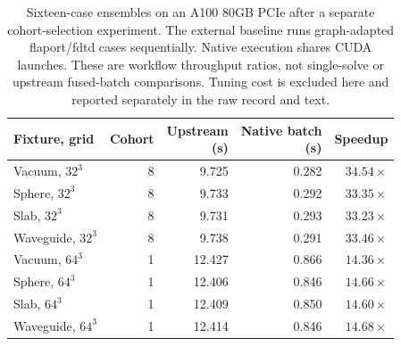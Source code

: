 \begin{table}[tbp]
\centering
\small
\renewcommand{\arraystretch}{1.15}
\caption{Sixteen-case ensembles on an A100 80GB PCIe after a separate cohort-selection experiment. The external baseline runs graph-adapted flaport/fdtd cases sequentially. Native execution shares CUDA launches. These are workflow throughput ratios, not single-solve or upstream fused-batch comparisons. Tuning cost is excluded here and reported separately in the raw record and text.}
\label{tab:ensembles}
\begin{tabular}{@{}lrrrr@{}}
\toprule
Fixture, grid & Cohort & \shortstack{Upstream\\(s)} & \shortstack{Native batch\\(s)} & Speedup \\
\midrule
Vacuum, $32^3$ & 8 & 9.725 & 0.282 & $34.54\times$ \\
Sphere, $32^3$ & 8 & 9.733 & 0.292 & $33.35\times$ \\
Slab, $32^3$ & 8 & 9.731 & 0.293 & $33.23\times$ \\
Waveguide, $32^3$ & 8 & 9.738 & 0.291 & $33.46\times$ \\
Vacuum, $64^3$ & 1 & 12.427 & 0.866 & $14.36\times$ \\
Sphere, $64^3$ & 1 & 12.406 & 0.846 & $14.66\times$ \\
Slab, $64^3$ & 1 & 12.409 & 0.850 & $14.60\times$ \\
Waveguide, $64^3$ & 1 & 12.414 & 0.846 & $14.68\times$ \\
\bottomrule
\end{tabular}
\end{table}
